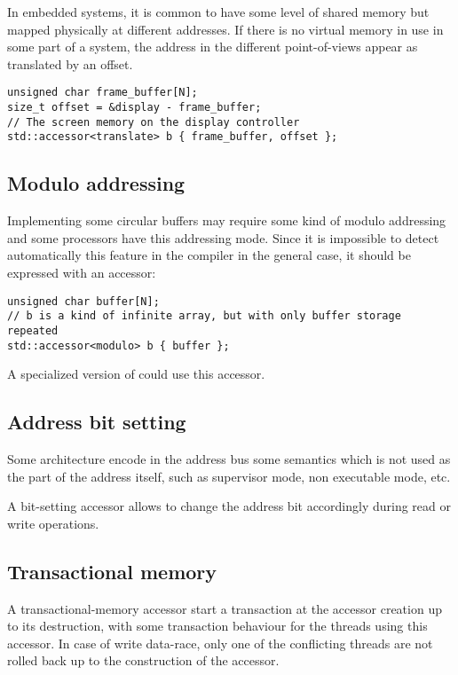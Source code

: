 \documentclass[a4paper]{article}
\begin{document}
In embedded systems, it is common to have some level of shared memory
but mapped physically at different addresses. If there is no virtual
memory in use in some part of a system, the address in the different
point-of-views appear as translated by an offset.
\begin{lstlisting}
unsigned char frame_buffer[N];
size_t offset = &display - frame_buffer;
// The screen memory on the display controller
std::accessor<translate> b { frame_buffer, offset };
\end{lstlisting}


\subsection{Modulo addressing}
\label{sec:modulo-addressing}

Implementing some circular buffers may require some kind of modulo
addressing and some processors have this addressing mode. Since it is
impossible to detect automatically this feature in the compiler in the
general case, it should be expressed with an accessor:
\begin{lstlisting}
unsigned char buffer[N];
// b is a kind of infinite array, but with only buffer storage repeated
std::accessor<modulo> b { buffer };
\end{lstlisting}
A specialized version of \cite{C++:P0059R1:ring} could use this
accessor.


\subsection{Address bit setting}
\label{sec:address-bit-setting}

Some architecture encode in the address bus some semantics which is
not used as the part of the address itself, such as supervisor mode,
non executable mode, etc.

A bit-setting accessor allows to change the address bit accordingly
during read or write operations.


\subsection{Transactional memory}
\label{sec:transactional-memory}

A transactional-memory accessor start a transaction at the accessor
creation up to its destruction, with some transaction behaviour for
the threads using this accessor. In case of write data-race, only one
of the conflicting threads are not rolled back up to the construction
of the accessor.
\end{document}
